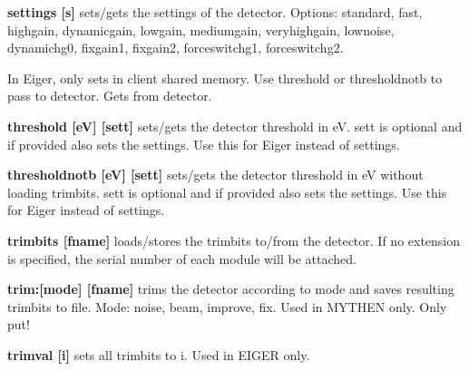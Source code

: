 \begin{DoxyItemize}
\item {\bfseries settings \mbox{[}s\mbox{]}} sets/gets the settings of the detector. Options: {\ttfamily standard}, {\ttfamily fast}, {\ttfamily highgain}, {\ttfamily dynamicgain}, {\ttfamily lowgain}, {\ttfamily mediumgain}, {\ttfamily veryhighgain}, {\ttfamily lownoise}, {\ttfamily dynamichg0}, {\ttfamily fixgain1}, {\ttfamily fixgain2}, {\ttfamily forceswitchg1}, {\ttfamily forceswitchg2}. \par
 In Eiger, only sets in client shared memory. Use {\ttfamily threshold} or {\ttfamily thresholdnotb} to pass to detector. Gets from detector.
\end{DoxyItemize}


\begin{DoxyItemize}
\item {\bfseries threshold \mbox{[}eV\mbox{]} \mbox{[}sett\mbox{]} } sets/gets the detector threshold in eV. sett is optional and if provided also sets the settings. Use this for Eiger instead of {\ttfamily settings}.
\end{DoxyItemize}


\begin{DoxyItemize}
\item {\bfseries thresholdnotb \mbox{[}eV\mbox{]} \mbox{[}sett\mbox{]} } sets/gets the detector threshold in eV without loading trimbits. sett is optional and if provided also sets the settings. Use this for Eiger instead of {\ttfamily settings}.
\end{DoxyItemize}


\begin{DoxyItemize}
\item {\bfseries trimbits \mbox{[}fname\mbox{]} } loads/stores the trimbits to/from the detector. If no extension is specified, the serial number of each module will be attached.
\end{DoxyItemize}


\begin{DoxyItemize}
\item {\bfseries trim:\mbox{[}mode\mbox{]} \mbox{[}fname\mbox{]}} trims the detector according to mode and saves resulting trimbits to file. Mode: noise, beam, improve, fix. Used in MYTHEN only. Only put!
\end{DoxyItemize}


\begin{DoxyItemize}
\item {\bfseries trimval \mbox{[}i\mbox{]}} sets all trimbits to i. Used in EIGER only.
\end{DoxyItemize}


